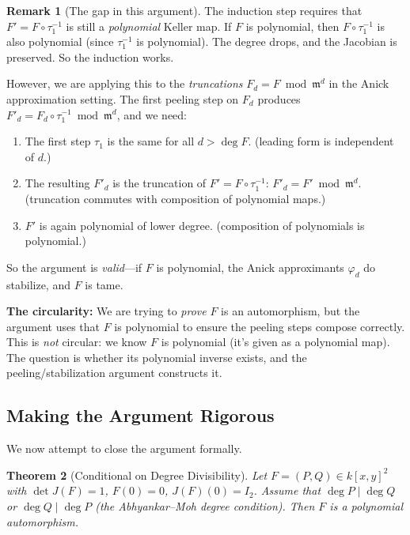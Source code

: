 \documentclass[12pt,a4paper]{article}
\newtheorem{theorem}{Theorem}[section]
\theoremstyle{definition}
\newtheorem{remark}[theorem]{Remark}
\newcommand{\kk}{k}
\newcommand{\pp}{\mathfrak{m}}
\begin{document}
\begin{remark}[The gap in this argument]
The induction step requires that $F' = F \circ \tau_1^{-1}$ is still a \emph{polynomial}
Keller map. If $F$ is polynomial, then $F \circ \tau_1^{-1}$ is also polynomial (since
$\tau_1^{-1}$ is polynomial). The degree drops, and the Jacobian is preserved. So the
induction works.

However, we are applying this to the \emph{truncations} $F_d = F \bmod \pp^d$ in the
Anick approximation setting. The first peeling step on $F_d$ produces
$F'_d = F_d \circ \tau_1^{-1} \bmod \pp^d$, and we need:
\begin{enumerate}
  \item The first step $\tau_1$ is the same for all $d > \deg F$. \checkmark (leading form is independent of $d$.)
  \item The resulting $F'_d$ is the truncation of $F' = F \circ \tau_1^{-1}$:
    $F'_d = F' \bmod \pp^d$. \checkmark (truncation commutes with composition of polynomial maps.)
  \item $F'$ is again polynomial of lower degree. \checkmark (composition of polynomials is polynomial.)
\end{enumerate}
So the argument is \emph{valid}---if $F$ is polynomial, the Anick approximants
$\varphi_d$ do stabilize, and $F$ is tame.

\textbf{The circularity:} We are trying to \emph{prove} $F$ is an automorphism, but the
argument uses that $F$ is polynomial to ensure the peeling steps compose correctly. This
is \emph{not} circular: we know $F$ is polynomial (it's given as a polynomial map). The
question is whether its polynomial inverse exists, and the peeling/stabilization argument
constructs it.
\end{remark}

\subsection{Making the Argument Rigorous}\label{sec:rigorous}

We now attempt to close the argument formally.

\begin{theorem}[Conditional on Degree Divisibility]\label{thm:conditional}
Let $F = (P, Q) \in \kk[x,y]^2$ with $\det J(F) = 1$, $F(0) = 0$, $J(F)(0) = I_2$.
Assume that $\deg P \mid \deg Q$ or $\deg Q \mid \deg P$ (the Abhyankar--Moh degree
condition). Then $F$ is a polynomial automorphism.
\end{theorem}
\end{document}

